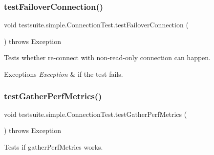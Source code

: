 \subsubsection{\texorpdfstring{test\+Failover\+Connection()}{testFailoverConnection()}}
{\footnotesize\ttfamily void testsuite.\+simple.\+Connection\+Test.\+test\+Failover\+Connection (\begin{DoxyParamCaption}{ }\end{DoxyParamCaption}) throws Exception}

Tests whether re-\/connect with non-\/read-\/only connection can happen.


\begin{DoxyExceptions}{Exceptions}
{\em Exception} & if the test fails. \\
\hline
\end{DoxyExceptions}
\mbox{\label{classtestsuite_1_1simple_1_1_connection_test_a3efc92c350b402367a66355fe3305381}} 
\subsubsection{\texorpdfstring{test\+Gather\+Perf\+Metrics()}{testGatherPerfMetrics()}}
{\footnotesize\ttfamily void testsuite.\+simple.\+Connection\+Test.\+test\+Gather\+Perf\+Metrics (\begin{DoxyParamCaption}{ }\end{DoxyParamCaption}) throws Exception}

Tests if gather\+Perf\+Metrics works.


